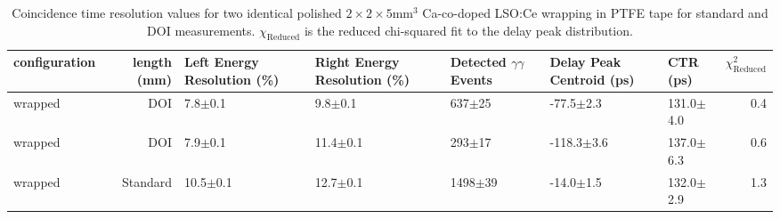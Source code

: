 \begin{table}
\caption{\label{tab:referencevals} Coincidence time resolution values for two identical polished $2\times2\times5$mm$^3$ Ca-co-doped LSO:Ce wrapping in PTFE tape for standard and DOI measurements. $\chi_\text{Reduced}$ is the reduced chi-squared fit to the delay peak distribution.}
\begin{tabular}{lrlllllr}
configuration &  length (mm) & Left Energy Resolution (\%) & Right Energy Resolution (\%) & Detected $\gamma\gamma$ Events & Delay Peak Centroid (ps) & CTR (ps) &  $\chi^2_\text{Reduced}$ \\
\hline
      wrapped &     DOI &   7.8$\pm$0.1 &   9.8$\pm$0.1 &   637$\pm$25 &   -77.5$\pm$2.3 &  131.0$\pm$4.0 &        0.4 \\
      wrapped &     DOI &   7.9$\pm$0.1 &  11.4$\pm$0.1 &   293$\pm$17 &  -118.3$\pm$3.6 &  137.0$\pm$6.3 &        0.6 \\
      wrapped &   Standard &  10.5$\pm$0.1 &  12.7$\pm$0.1 &  1498$\pm$39 &   -14.0$\pm$1.5 &  132.0$\pm$2.9 &        1.3 \\
\hline
\end{tabular}
\end{table}
